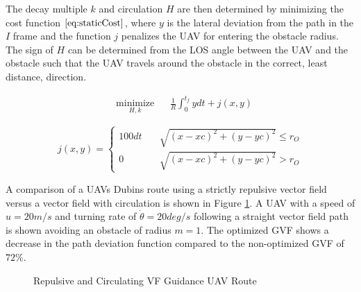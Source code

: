 \documentclass[conf]{new-aiaa}
\begin{document}
The decay multiple $k$ and circulation $H$ are then determined by minimizing the cost function $\ref{eq:staticCost}$, where $y$ is the lateral deviation from the path in the $I$ frame and the function $j$ penalizes the UAV for entering the obstacle radius. The sign of $H$ can be determined from the LOS angle between the UAV and the obstacle such that the UAV travels around the obstacle in the correct, least distance, direction.

\begin{equation}
\label{eq:staticCost}
\begin{aligned}
& \underset{H,k}{\text{minimize}}
& & \frac{1}{R}\int_{0}^{t_f}ydt + j(x,y) 
\end{aligned}
\end{equation}


\begin{equation}
j(x,y) = \left\{
\begin{array}{ll}
100dt & \quad \sqrt{(x-xc)^2+(y-yc)^2} \leq r_O \\
0 & \quad \sqrt{ (x-xc)^2+(y-yc)^2 } > r_O
\end{array}
\right.
\end{equation}




A comparison of a UAVs Dubins route using a strictly repulsive vector field versus a vector field with circulation is shown in Figure \ref{fig:noCircVsCirc}. A UAV with a speed of $u=20 m/s$ and turning rate of $\dot{\theta} = 20 deg/s$ following a straight vector field path is shown avoiding an obstacle of radius $m=1$. The optimized GVF shows a decrease in the path deviation function compared to the non-optimized GVF of $72 \% $.

\begin{figure}[H]
	\begin{subfigmatrix}{2}%
		\centering	
		\hspace*{0mm}
	\end{subfigmatrix}
	\caption{Repulsive and Circulating VF Guidance UAV Route}
	\label{fig:noCircVsCirc}
\end{figure}
\end{document}
